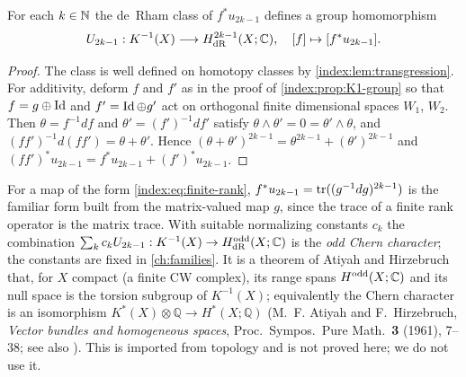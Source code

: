 \begin{proposition}\label{index:prop:odd-chern}
  For each $k\in\mathbb{N}$ the de~Rham class of $f^*u_{2k-1}$ defines a group
  homomorphism
  \begin{equation*}
    U_{2k-1}:K^{-1}(X)\longrightarrow H^{2k-1}_{\mathrm{dR}}(X;\mathbb{C}),\quad
    [f]\mapsto[f^*u_{2k-1}].
  \end{equation*}
\end{proposition}
\begin{proof}
  The class is well defined on homotopy classes by
  \cref{index:lem:transgression}. For additivity, deform $f$ and $f'$ as in the
  proof of \cref{index:prop:K1-group} so that $f=g\oplus\operatorname{Id}$ and
  $f'=\operatorname{Id}\oplus g'$ act on orthogonal finite dimensional spaces $W_1$, $W_2$.
  Then $\theta=f^{-1}df$ and $\theta'=(f')^{-1}df'$ satisfy
  $\theta\wedge\theta'=0=\theta'\wedge\theta$, and $(ff')^{-1}d(ff')=\theta+\theta'$.
  Hence
  $(\theta+\theta')^{2k-1}=\theta^{2k-1}+(\theta')^{2k-1}$ and
  $(ff')^*u_{2k-1}=f^*u_{2k-1}+(f')^*u_{2k-1}$.
\end{proof}

\begin{remark}\label{index:rem:odd-chern-character}
  For a map of the form \eqref{index:eq:finite-rank},
  $f^*u_{2k-1}=\operatorname{tr}((g^{-1}dg)^{2k-1})$ is the familiar form built from the
  matrix-valued map $g$, since the trace of a finite rank operator is the
  matrix trace. With suitable normalizing constants $c_k$ the combination
  $\sum_kc_kU_{2k-1}:K^{-1}(X)\to H^{\mathrm{odd}}_{\mathrm{dR}}(X;\mathbb{C})$ is the
  \emph{odd Chern character}; the constants are fixed in \cref{ch:families}.
  It is a theorem of Atiyah and Hirzebruch that, for $X$ compact (a finite
  CW complex), its range spans $H^{\mathrm{odd}}(X;\mathbb{C})$ and its null space is
  the torsion subgroup of $K^{-1}(X)$; equivalently the Chern character is an
  isomorphism $K^*(X)\otimes\mathbb Q\to H^*(X;\mathbb Q)$ (M.~F. Atiyah and
  F.~Hirzebruch, \emph{Vector bundles and homogeneous spaces}, Proc.\ Sympos.\
  Pure Math.\ \textbf{3} (1961), 7--38; see also \cite{Atiyah-K}). This is
  imported from topology and is not proved here; we do not use it.
\end{remark}

